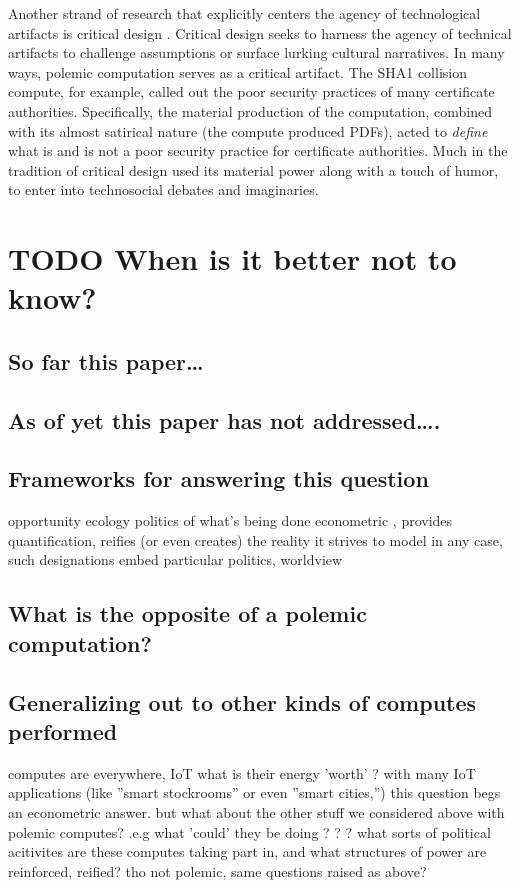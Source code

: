 \documentclass[sigconf]{acmart}
\begin{document}
Another strand of research that explicitly centers the agency of technological artifacts
is critical design \cite{Dunne2001}.
Critical design seeks to harness the agency of technical artifacts 
to challenge assumptions or surface lurking cultural narratives.
In many ways, polemic computation serves as a critical artifact.
The SHA1 collision compute, for example, 
called out the poor security practices of many certificate authorities.
Specifically, the material production of the computation,
combined with its almost satirical nature (the compute produced PDFs),
acted to \emph{define} what is and is not a poor security practice for certificate authorities.
Much in the tradition of critical design
used its material power \cite{Bennett2013a} along with a touch of humor, to enter into technosocial debates and imaginaries.

\section{{\bfseries\sffamily TODO} When is it better not to know?}
\label{sec:orgc0c330a}

\subsection{So far this paper\ldots{}}
\label{sec:org6105566}

\subsection{As of yet this paper has not addressed\ldots{}.}
\label{sec:org78ead3c}

\subsection{Frameworks for answering this question}
\label{sec:org3cc9931}
opportunity
ecology
politics of what's being done
econometric , provides quantification, reifies (or even creates) the reality it strives to model
in any case, such designations embed particular politics, worldview

\subsection{What is the opposite of a polemic computation?}
\label{sec:org34251f8}

\subsection{Generalizing out to other kinds of computes performed}
\label{sec:org97c409d}
computes are everywhere, IoT 
what is their energy 'worth' ?
with many IoT applications (like ''smart stockrooms'' or even ''smart cities,'')
this question begs an econometric answer.
but what about the other stuff we considered above with polemic computes?
.e.g what 'could' they be doing ? ? ? 
what sorts of political acitivites are these computes taking part in, and what structures of power are reinforced, reified?
tho not polemic, same questions raised as above?
\end{document}
